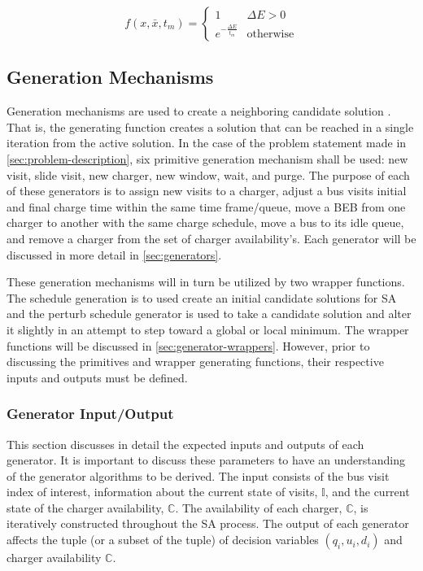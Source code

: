 \documentclass[11pt,a4paper,final]{article}
\newcommand{\I}{\mathbb{I}}                 %
\newcommand{\C}{\mathbb{C}}                 %
\begin{document}
\begin{equation}
\label{eq:candaccept}
f(x,\bar{x},t_m) =
\begin{cases}
  1                   & \Delta E > 0 \\
  e^{- \frac{\Delta E}{t_m}} & \text{otherwise}
\end{cases}
\end{equation}

\subsection{Generation Mechanisms}
\label{sec:generation-mechanisms}
Generation mechanisms are used to create a neighboring candidate solution \cite{gendreau-2018-handb-metah}. That is,
the generating function creates a solution that can be reached in a single iteration from the active solution. In the
case of the problem statement made in \ref{sec:problem-description}, six primitive generation mechanism shall be used: new
visit, slide visit, new charger, new window, wait, and purge. The purpose of each of these generators is to assign new
visits to a charger, adjust a bus visits initial and final charge time within the same time frame/queue, move a BEB from
one charger to another with the same charge schedule, move a bus to its idle queue, and remove a charger from the set
of charger availability's. Each generator will be discussed in more detail in \ref{sec:generators}.

These generation mechanisms will in turn be utilized by two wrapper functions. The schedule generation is to used create
an initial candidate solutions for SA and the perturb schedule generator is used to take a candidate solution and alter
it slightly in an attempt to step toward a global or local minimum. The wrapper functions will be discussed in
\ref{sec:generator-wrappers}. However, prior to discussing the primitives and wrapper generating functions, their respective
inputs and outputs must be defined.

\subsubsection{Generator Input/Output}
\label{sec:generator-input-output}
This section discusses in detail the expected inputs and outputs of each generator. It is important to discuss these
parameters to have an understanding of the generator algorithms to be derived. The input consists of the bus visit index
of interest, information about the current state of visits, \(\I\), and the current state of the charger availability,
\(\C\). The availability of each charger, \(\C\), is iteratively constructed throughout the SA process. The output of each
generator affects the tuple (or a subset of the tuple) of decision variables \((q_i, u_i, d_i)\) and charger availability
\(\C\).
\end{document}

